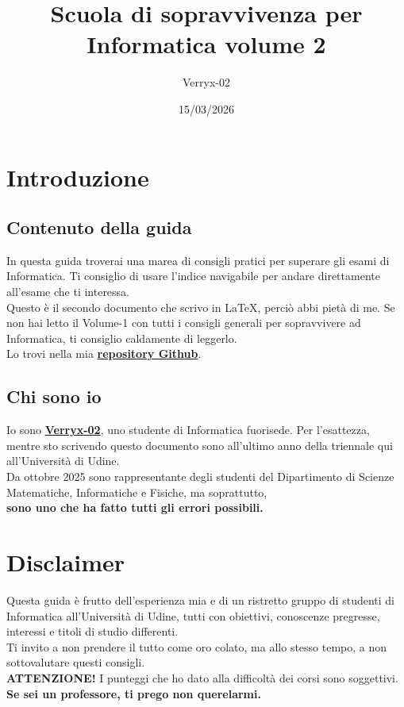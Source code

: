 \documentclass[18pt]{extarticle}
\title{Scuola di sopravvivenza per Informatica volume 2}
\author{Verryx-02}
\date{15/03/2026}
\begin{document}
\maketitle

\tableofcontents
\newpage

\section{Introduzione}

\subsection{Contenuto della guida}
In questa guida troverai una marea di consigli pratici per superare gli esami di Informatica. Ti consiglio di usare l'indice navigabile per andare direttamente all'esame che ti interessa.\\
Questo è il secondo documento che scrivo in \LaTeX, perciò abbi pietà di me.
Se non hai letto il Volume-1 con tutti i consigli generali per sopravvivere ad Informatica, ti consiglio caldamente di leggerlo.\\
Lo trovi nella mia \href{https://github.com/Verryx-02/Scuola-di-sopravvivenza-per-studenti-di-Informatica}{\textbf{repository Github}}. 

\subsection{Chi sono io}
Io sono \href{https://github.com/Verryx-02}{\textbf{Verryx-02}}, uno studente di Informatica fuorisede. 
Per l'esattezza, mentre sto scrivendo questo documento sono all'ultimo anno della triennale qui all'Università di Udine.\\
Da ottobre 2025 sono rappresentante degli studenti del Dipartimento di Scienze Matematiche, Informatiche e Fisiche, ma soprattutto,\\
\textbf{sono uno che ha fatto tutti gli errori possibili.}\\


\section{Disclaimer}
Questa guida è frutto dell'esperienza mia e di un ristretto gruppo di studenti di Informatica all'Università di Udine, tutti con obiettivi, conoscenze pregresse, interessi e titoli di studio differenti.\\
Ti invito a non prendere il tutto come oro colato, ma allo stesso tempo, a non sottovalutare questi consigli.\\
\textbf{ATTENZIONE!} I punteggi che ho dato alla difficoltà dei corsi sono soggettivi.\\ 
\textbf{Se sei un professore, ti prego non querelarmi.}
\end{document}

